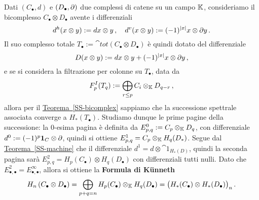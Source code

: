 \begin{ex!}
	Dati $(C_{\bullet},d)$ e $(D_{\bullet},\partial)$ due complessi di catene su un campo $\mathbb{K}$,
	consideriamo il bicomplesso $C_{\bullet} \otimes D_{\bullet}$ avente i differenziali
	\begin{equation*}
		d^{h}(x \otimes y) := dx \otimes y\,, \quad 
		d^{v}(x \otimes y) := (-1)^{\lvert x \rvert} x \otimes \partial y\,.
	\end{equation*}
	Il suo complesso totale $T_{\bullet} := 
	\cat{tot}\left( C_{\bullet} \otimes D_{\bullet} \right)$
	è quindi dotato del differenziale
		\begin{equation*}
			D(x \otimes y) := dx \otimes y + (-1)^{\lvert x \rvert} x \otimes \partial y \,,
		\end{equation*}
		e se si considera la filtrazione per colonne su $T_{\bullet}$, 
		data da
		\begin{equation*}
			F_{p}^{I}(T_{q}) := \bigoplus_{r \le p} C_{i} \otimes_{\mathbb{K}} D_{q-r}\,,
		\end{equation*}
		allora per il \hyperref[SS-bicomplex]{Teorema~\ref{SS-bicomplex}}
		sappiamo che la successione spettrale associata converge a $H_{*}(T_{\bullet})$.
		Studiamo dunque le prime pagine della successione:
		la $0$-esima pagina è definita da $E^{0}_{p,q} := C_{p} \otimes_{\mathbb{K}} D_{q}$,
		con differenziale $d^{0} := (-1)^{p} {\normalfont\textbf{1}}_{C} \otimes \partial$,
		quindi si ottiene $E^{1}_{p,q} = C_{p} \otimes_{\mathbb{K}} H_{q}(D_{*})$.
		Segue dal \hyperref[SS-machine]{Teorema~\ref{SS-machine}} che
		il differenziale $d^{1} = d \otimes \cat{1}_{H_{*}(D)}$,
		quindi la seconda pagina sarà 
		$E^{2}_{p,q} = H_{p}(C_{\bullet}) \otimes H_{q}(D_{\bullet})$
		con differenziali tutti nulli.
		Dato che $E_{\bullet,\bullet}^{2} = E_{\bullet, \bullet}^{\infty}$, 
		allora si ottiene la \textbf{Formula di Künneth}
	\begin{equation}\label{kunneth}
		H_{n}\left( C_{\bullet} \otimes D_{\bullet} \right)
		= \bigoplus_{p+q=n} H_{p}(C_{\bullet}) \otimes_{\mathbb{K}} H_{q}(D_{\bullet}) 
		= \big(  H_{*}(C_{\bullet}) \otimes H_{*}(D_{\bullet}) \big)_{n} \,.
	\end{equation}
\end{ex!}

